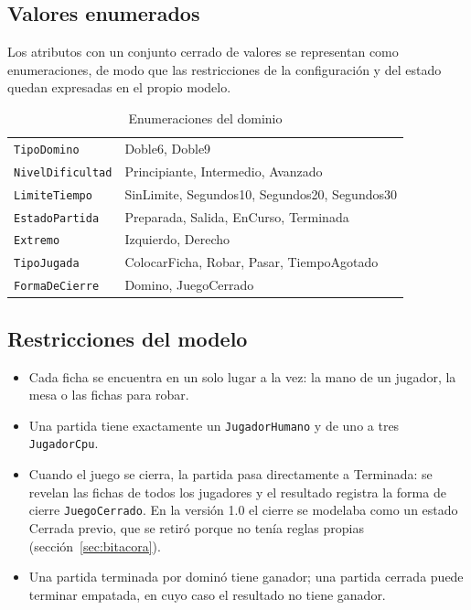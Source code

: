 \subsection{Valores enumerados}

Los atributos con un conjunto cerrado de valores se representan como enumeraciones, de modo que las restricciones de la configuración y del estado quedan expresadas en el propio modelo.


\begin{table}[H]
\caption{Enumeraciones del dominio}\label{tab:enumeraciones}
\tablacompacta
\begin{tabularx}{\textwidth}{@{}L{3.4cm}Y@{}}
  \toprule
   &  \\ \midrule
  \texttt{TipoDomino} & Doble6, Doble9 \\ \filasep
  \texttt{NivelDificultad} & Principiante, Intermedio, Avanzado \\ \filasep
  \texttt{LimiteTiempo} & SinLimite, Segundos10, Segundos20, Segundos30 \\ \filasep
  \texttt{EstadoPartida} & Preparada, Salida, EnCurso, Terminada \\ \filasep
  \texttt{Extremo} & Izquierdo, Derecho \\ \filasep
  \texttt{TipoJugada} & ColocarFicha, Robar, Pasar, TiempoAgotado \\ \filasep
  \texttt{FormaDeCierre} & Domino, JuegoCerrado \\
  \bottomrule
\end{tabularx}
\end{table}

\subsection{Restricciones del modelo}

\begin{itemize}
  \item Cada ficha se encuentra en un solo lugar a la vez: la mano de un jugador, la mesa o las fichas para robar.
  \item Una partida tiene exactamente un \texttt{JugadorHumano} y de uno a tres \texttt{JugadorCpu}.
  \item Cuando el juego se cierra, la partida pasa directamente a Terminada: se revelan las fichas de todos los jugadores y el resultado registra la forma de cierre \texttt{JuegoCerrado}. En la versión 1.0 el cierre se modelaba como un estado Cerrada previo, que se retiró porque no tenía reglas propias (sección~\ref{sec:bitacora}).
  \item Una partida terminada por dominó tiene ganador; una partida cerrada puede terminar empatada, en cuyo caso el resultado no tiene ganador.
\end{itemize}
